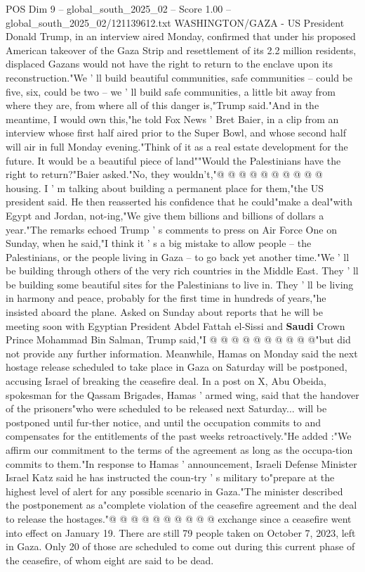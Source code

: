\begin{textsample}{POS Dim 9 – global\_south\_2025\_02 – Score 1.00 – global\_south\_2025\_02/121139612.txt}  \label{ex:f9_pos_262}
WASHINGTON/GAZA - US President Donald Trump, in an interview aired Monday, confirmed that under his proposed American takeover of the Gaza Strip and resettlement of its 2.2 million residents, displaced Gazans would not have the right to return to the enclave upon its reconstruction."We ' ll build beautiful communities, safe communities -- could be five, six, could be two -- we ' ll build safe communities, a little bit away from where they are, from where all of this danger is,"Trump said."And in the meantime, I would own this,"he told Fox News ' Bret Baier, in a clip from an interview whose first half aired prior to the Super Bowl, and whose second half will air in full Monday evening."Think of it as a real estate development for the future.
It would be a beautiful piece of land""Would the Palestinians have the right to return?"Baier asked."No, they wouldn't,"@ @ @ @ @ @ @ @ @ @ housing.
I ' m talking about building a permanent place for them,"the US president said.
He then reasserted his confidence that he could"make a deal"with Egypt and Jordan, not-ing,"We give them billions and billions of dollars a year."The remarks echoed Trump ' s comments to press on Air Force One on Sunday, when he said,"I think it ' s a big mistake to allow people -- the Palestinians, or the people living in Gaza -- to go back yet another time."We ' ll be building through others of the very rich countries in the Middle East.
They ' ll be building some beautiful sites for the Palestinians to live in.
They ' ll be living in harmony and peace, probably for the first time in hundreds of years,"he insisted aboard the plane.
Asked on Sunday about reports that he will be meeting soon with Egyptian President Abdel Fattah el-Sissi and \textbf{Saudi} Crown Prince Mohammad Bin Salman, Trump said,"I @ @ @ @ @ @ @ @ @ @"but did not provide any further information.
Meanwhile, Hamas on Monday said the next hostage release scheduled to take place in Gaza on Saturday will be postponed, accusing Israel of breaking the ceasefire deal.
In a post on X, Abu Obeida, spokesman for the Qassam Brigades, Hamas ' armed wing, said that the handover of the prisoners"who were scheduled to be released next Saturday... will be postponed until fur-ther notice, and until the occupation commits to and compensates for the entitlements of the past weeks retroactively."He added :"We affirm our commitment to the terms of the agreement as long as the occupa-tion commits to them."In response to Hamas ' announcement, Israeli Defense Minister Israel Katz said he has instructed the coun-try ' s military to"prepare at the highest level of alert for any possible scenario in Gaza."The minister described the postponement as a"complete violation of the ceasefire agreement and the deal to release the hostages."@ @ @ @ @ @ @ @ @ @ exchange since a ceasefire went into effect on January 19.
There are still 79 people taken on October 7, 2023, left in Gaza.
Only 20 of those are scheduled to come out during this current phase of the ceasefire, of whom eight are said to be dead.

\end{textsample}
